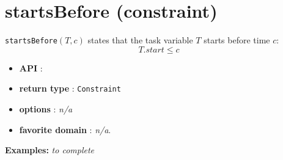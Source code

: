\section{startsBefore (constraint)}\label{startsbefore:startsbeforeconstraint}\hypertarget{startsbefore:startsbeforeconstraint}{}
\begin{notedef}
  \texttt{startsBefore}$(T,c)$ states that the task variable $T$ starts before time $c$:
  $$T.start \le c$$
\end{notedef}

\begin{itemize}
	\item \textbf{API} :
	\item \textbf{return type} : \texttt{Constraint}
	\item \textbf{options} : \emph{n/a}
	\item \textbf{favorite domain} : \emph{n/a}.
\end{itemize}

\textbf{Examples:}
%
\emph{to complete}
